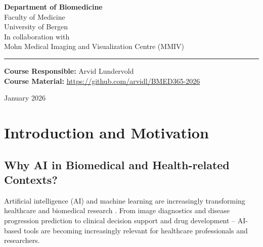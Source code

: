 \documentclass[11pt,a4paper]{article}
\begin{document}
\begin{titlepage}

\vspace{1cm}

{\large
\textbf{Department of Biomedicine}\\
Faculty of Medicine\\
University of Bergen\\[0.5cm]
In collaboration with\\
Mohn Medical Imaging and Visualization Centre (MMIV)
}

\vspace{0.8cm}

\rule{0.6\textwidth}{0.4pt}

\vspace{0.5cm}

{\normalsize
\textbf{Course Responsible:} Arvid Lundervold\\[0.2cm]
\textbf{Course Material:} \url{https://github.com/arvidl/BMED365-2026}
}

\vfill
{\footnotesize January 2026}

\end{titlepage}

\tableofcontents
\newpage

\section{Introduction and Motivation}

\subsection{Why AI in Biomedical and Health-related Contexts?}

Artificial intelligence (AI) and machine learning are increasingly transforming healthcare and biomedical research \citep{topol2019high}. From image diagnostics and disease progression prediction to clinical decision support and drug development -- AI-based tools are becoming increasingly relevant for healthcare professionals and researchers.
\end{document}
